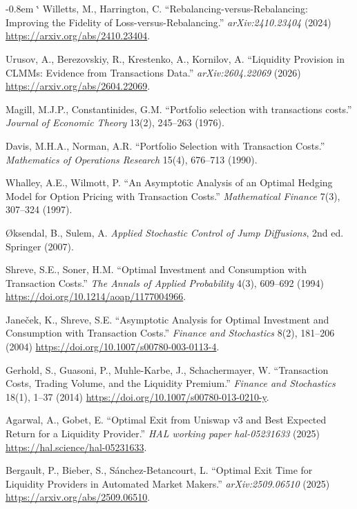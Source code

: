 \documentclass[11pt,a4paper]{article}
\makeatletter
\renewenvironment{thebibliography}[1]
  {\section*{\refname}%
   \fontsize{10pt}{12pt}\selectfont
   \list{\@biblabel{\@arabic\c@enumiv}}%
        {\settowidth\labelwidth{\@biblabel{#1}}%
         \leftmargin\labelwidth
         \advance\leftmargin-0.8em
         \advance\leftmargin\labelsep
         \setlength\itemindent{1em}%
         \setlength\itemsep{6pt plus 1pt minus 1pt}%
         \setlength\parsep{0pt}%
         \usecounter{enumiv}%
         \let\p@enumiv\@empty
         \renewcommand\theenumiv{\@arabic\c@enumiv}}%
   \sloppy\clubpenalty4000\widowpenalty4000\sfcode`\.\@m}
  {\def\@noitemerr{\@latex@warning{Empty `thebibliography' environment}}%
   \endlist}
\theoremstyle{definition}
\theoremstyle{plain}
\theoremstyle{remark}
\makeatother
\begin{document}
\begin{thebibliography}{45}
Willetts, M., Harrington, C. ``Rebalancing-versus-Rebalancing: Improving the Fidelity of Loss-versus-Rebalancing.'' \emph{arXiv:2410.23404} (2024) \url{https://arxiv.org/abs/2410.23404}.

Urusov, A., Berezovskiy, R., Krestenko, A., Kornilov, A. ``Liquidity Provision in CLMMs: Evidence from Transactions Data.'' \emph{arXiv:2604.22069} (2026) \url{https://arxiv.org/abs/2604.22069}.

Magill, M.J.P., Constantinides, G.M. ``Portfolio selection with transactions costs.'' \emph{Journal of Economic Theory} 13(2), 245--263 (1976).

Davis, M.H.A., Norman, A.R. ``Portfolio Selection with Transaction Costs.'' \emph{Mathematics of Operations Research} 15(4), 676--713 (1990).

Whalley, A.E., Wilmott, P. ``An Asymptotic Analysis of an Optimal Hedging Model for Option Pricing with Transaction Costs.'' \emph{Mathematical Finance} 7(3), 307--324 (1997).

\O ksendal, B., Sulem, A. \emph{Applied Stochastic Control of Jump Diffusions}, 2nd ed. Springer (2007).

Shreve, S.E., Soner, H.M. ``Optimal Investment and Consumption with Transaction Costs.'' \emph{The Annals of Applied Probability} 4(3), 609--692 (1994) \url{https://doi.org/10.1214/aoap/1177004966}.

Jane\v{c}ek, K., Shreve, S.E. ``Asymptotic Analysis for Optimal Investment and Consumption with Transaction Costs.'' \emph{Finance and Stochastics} 8(2), 181--206 (2004) \url{https://doi.org/10.1007/s00780-003-0113-4}.

Gerhold, S., Guasoni, P., Muhle-Karbe, J., Schachermayer, W. ``Transaction Costs, Trading Volume, and the Liquidity Premium.'' \emph{Finance and Stochastics} 18(1), 1--37 (2014) \url{https://doi.org/10.1007/s00780-013-0210-y}.

Agarwal, A., Gobet, E. ``Optimal Exit from Uniswap v3 and Best Expected Return for a Liquidity Provider.'' \emph{HAL working paper hal-05231633} (2025) \url{https://hal.science/hal-05231633}.

Bergault, P., Bieber, S., S\'anchez-Betancourt, L. ``Optimal Exit Time for Liquidity Providers in Automated Market Makers.'' \emph{arXiv:2509.06510} (2025) \url{https://arxiv.org/abs/2509.06510}.


\end{thebibliography}
\end{document}
